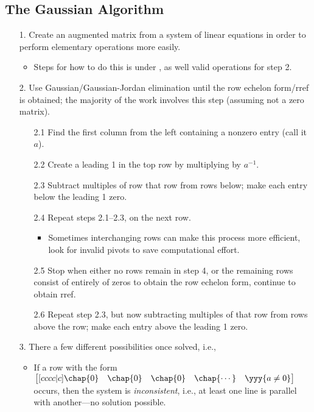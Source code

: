 \begin{itemize}
  \subsection{The Gaussian Algorithm}\label{The Gaussian Algorithm}
  \begin{itemize}
    \item[1.] Create an augmented matrix from a system of linear equations in order to perform elementary operations more easily. 
      \begin{itemize}
        \item Steps for how to do this is under \hyperref[Elementary Operations]{}, as well valid operations for step 2.
      \end{itemize}
    \item[2.] Use Gaussian/Gaussian-Jordan elimination until the row echelon form/rref is obtained; the majority of the work involves this step (assuming not a zero matrix). 
    \begin{enumerate}
      \item[2.1] Find the first column from the left containing a nonzero entry (call it \(a\)).
      \item[2.2] Create a leading 1 in the top row by multiplying by \(a^{-1}\).
      \item[2.3] Subtract multiples of row that row from rows below; make each entry below the leading 1 zero. 
      \item[2.4] Repeat steps 2.1--2.3, on the next row.
      \begin{itemize}
        \item Sometimes interchanging rows can make this process more efficient, look for invalid pivots to save computational effort.
      \end{itemize}
      \item[2.5] Stop when either no rows remain in step 4, or the remaining rows consist of entirely of zeros to obtain the row echelon form, continue to obtain rref.
      \item[2.6] Repeat step 2.3, but now subtracting multiples of that row from rows above the row; make each entry above the leading 1 zero.
    \end{enumerate}
    \item[3.] There a few different possibilities once solved, i.e.,
    \begin{itemize}
      \item If a row with the form 
      \(\begin{bmatrix}[cccc|c] \chap{0} & \chap{0} & \chap{0} &\chap{\cdots} & \yyy{a \neq 0} \end{bmatrix}\) occurs, then the system is \emph{inconsistent}, i.e., at least one line is parallel with another---no solution possible.

\end{itemize}
\end{itemize}
\end{itemize}

